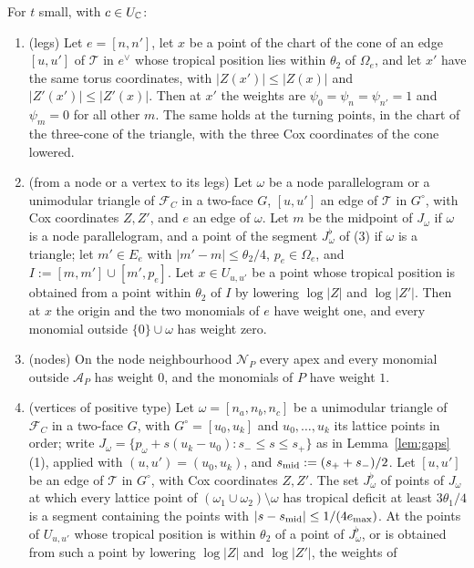 \begin{lemma}\label{lem:windows}
For $t$ small, with $c\in U_\mathbb C$:
\begin{enumerate}
\item (legs) Let $e=[n,n']$, let $x$ be a point of the chart of the cone of an edge $[u,u']$ of $\mathcal T$ in $e^\vee$
whose tropical position lies within $\theta_2$ of $\Omega_e$, and let $x'$ have the same torus coordinates, with
$|Z(x')|\le|Z(x)|$ and $|Z'(x')|\le|Z'(x)|$. Then at $x'$ the weights are $\psi_0=\psi_n=\psi_{n'}=1$ and $\psi_m=0$ for all
other $m$. The same holds at the turning points, in the chart of the three-cone of the triangle, with the three Cox
coordinates of the cone lowered.
\item[(1$'$)] (from a node or a vertex to its legs) Let $\omega$ be a node parallelogram or a unimodular triangle of
$\mathcal F_C$ in a two-face $G$, $[u,u']$ an edge of $\mathcal T$ in $G^\circ$, with Cox coordinates $Z,Z'$, and $e$ an
edge of $\omega$. Let $m$ be the midpoint of $J_\omega$ if $\omega$ is a node parallelogram, and a point of the segment
$J^\flat_\omega$ of (3) if $\omega$ is a triangle; let $m'\in E_e$ with $|m'-m|\le\theta_2/4$, $p_e\in\Omega_e$, and
$I:=[m,m']\cup[m',p_e]$. Let $x\in U_{u,u'}$ be a point whose tropical position is obtained from a point within $\theta_2$
of $I$ by lowering $\log|Z|$ and $\log|Z'|$. Then at $x$ the origin and the two monomials of $e$ have weight one, and every
monomial outside $\{0\}\cup\omega$ has weight zero.
\item (nodes) On the node neighbourhood $\mathcal N_P$ every apex and every monomial outside $\mathcal A_P$ has weight $0$,
and the monomials of $P$ have weight $1$.
\item (vertices of positive type) Let $\omega=[n_a,n_b,n_c]$ be a unimodular triangle of $\mathcal F_C$ in a two-face $G$,
with $G^\circ=[u_0,u_k]$ and $u_0,\dots,u_k$ its lattice points in order; write $J_\omega=\{p_\omega+s(u_k-u_0):s_-\le s\le
s_+\}$ as in Lemma~\ref{lem:gaps}(1), applied with $(u,u')=(u_0,u_k)$, and $s_{\rm mid}:=(s_++s_-)/2$. Let $[u,u']$ be an
edge of $\mathcal T$ in $G^\circ$, with Cox coordinates $Z,Z'$. The set $J^\flat_\omega$ of points of $J_\omega$ at which every
lattice point of $(\omega_1\cup\omega_2)\setminus\omega$ has tropical deficit at least $3\theta_1/4$ is a segment containing
the points with $|s-s_{\rm mid}|\le1/(4e_{\max})$. At the points of $U_{u,u'}$ whose tropical position is within $\theta_2$
of a point of $J^\flat_\omega$, or is obtained from such a point by lowering $\log|Z|$ and $\log|Z'|$, the weights of

\end{enumerate}
\end{lemma}
